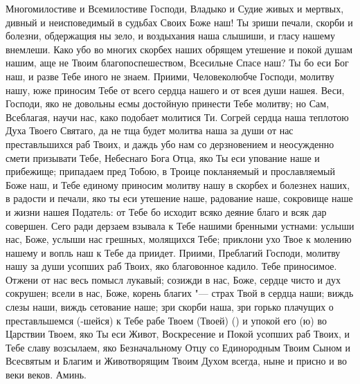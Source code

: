 \begin{mymulticols}
 

Многомилостиве и Всемилостиве Господи, Владыко и Судие живых и мертвых, дивный и неисповедимый в судьбах Своих Боже наш! Ты зриши печали, скорби и болезни, обдержащия ны зело, и воздыхания наша слышиши, и гласу нашему внемлеши. Како убо во многих скорбех наших обрящем утешение и покой душам нашим, аще не Твоим благопоспешеством, Всесильне Спасе наш? Ты бо еси Бог наш, и разве Тебе иного не знаем. Приими, Человеколюбче Господи, молитву нашу, юже приносим Тебе от всего сердца нашего и от всея души нашея. Веси, Господи, яко не довольны есмы достойную принести Тебе молитву; но Сам, Всеблагая, научи нас, како подобает молитися Ти. Согрей сердца наша теплотою Духа Твоего Святаго, да не тща будет молитва наша за души от нас преставльшихся раб Твоих, и даждь убо нам со дерзновением и неосужденно смети призывати Тебе, Небеснаго Бога Отца, яко Ты еси упование наше и прибежище; припадаем пред Тобою, в Троице покланяемый и прославляемый Боже наш, и Тебе единому приносим молитву нашу в скорбех и болезнех наших, в радости и печали, яко ты еси утешение наше, радование наше, сокровище наше и жизни нашея Податель: от Тебе бо исходит всяко деяние благо и всяк дар совершен. Сего ради дерзаем взывала к Тебе нашими бренными устнами: услыши нас, Боже, услыши нас грешных, молящихся Тебе; приклони ухо Твое к молению нашему и вопль наш к Тебе да приидет. Приими, Преблагий Господи, молитву нашу за души усопших раб Твоих, яко благовонное кадило. Тебе приносимое. Отжени от нас весь помысл лукавый; созижди в нас, Боже, сердце чисто и дух сокрушен; всели в нас, Боже, корень благих "--- страх Твой в сердца наши; виждь слезы наши, виждь сетование наше; зри скорби наша, зри горько плачущих о преставльшемся (-шейся) к Тебе рабе Твоем (Твоей) () и упокой его (ю) во Царствии Твоем, яко Ты еси Живот, Воскресение и Покой усопших раб Твоих, и Тебе славу возсылаем, яко Безначальному Отцу со Единородным Твоим Сыном и Всесвятым и Благим и Животворящим Твоим Духом всегда, ныне и присно и во веки веков. Аминь. 

\end{mymulticols}

\mychapterending

